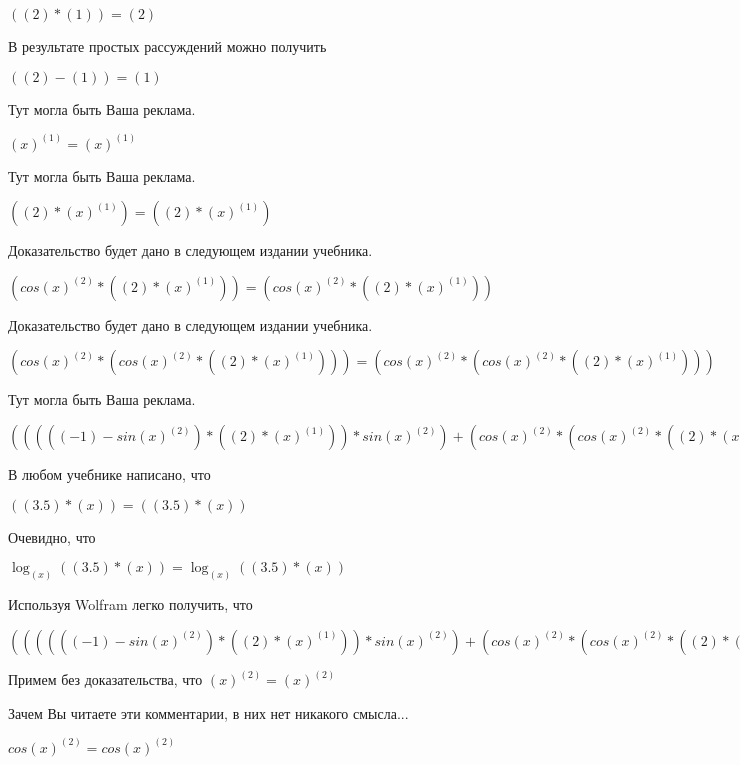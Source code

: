 \documentclass[12pt,a4paper,fleqn]{article}
\theoremstyle{definition}
\begin{document}
$(( 2 ) * ( 1 )) = ( 2 )$

В результате простых рассуждений можно получить

$(( 2 ) - ( 1 )) = ( 1 )$

Тут могла быть Ваша реклама.

${( x )}^{( 1 )} = {( x )}^{( 1 )}$

Тут могла быть Ваша реклама.

$(( 2 ) * {( x )}^{( 1 )}) = (( 2 ) * {( x )}^{( 1 )})$

Доказательство будет дано в следующем издании учебника.

$(cos{( x )}^{( 2 )} * (( 2 ) * {( x )}^{( 1 )})) = (cos{( x )}^{( 2 )} * (( 2 ) * {( x )}^{( 1 )}))$

Доказательство будет дано в следующем издании учебника.

$(cos{( x )}^{( 2 )} * (cos{( x )}^{( 2 )} * (( 2 ) * {( x )}^{( 1 )}))) = (cos{( x )}^{( 2 )} * (cos{( x )}^{( 2 )} * (( 2 ) * {( x )}^{( 1 )})))$

Тут могла быть Ваша реклама.

$((((( -1 ) - sin{( x )}^{( 2 )}) * (( 2 ) * {( x )}^{( 1 )})) * sin{( x )}^{( 2 )}) + (cos{( x )}^{( 2 )} * (cos{( x )}^{( 2 )} * (( 2 ) * {( x )}^{( 1 )})))) = ((((( -1 ) - sin{( x )}^{( 2 )}) * (( 2 ) * {( x )}^{( 1 )})) * sin{( x )}^{( 2 )}) + (cos{( x )}^{( 2 )} * (cos{( x )}^{( 2 )} * (( 2 ) * {( x )}^{( 1 )}))))$

В любом учебнике написано, что

$(( 3.5 ) * ( x )) = (( 3.5 ) * ( x ))$

Очевидно, что

$\log_{( x )}{(( 3.5 ) * ( x ))} = \log_{( x )}{(( 3.5 ) * ( x ))}$

Используя Wolfram легко получить, что

$(((((( -1 ) - sin{( x )}^{( 2 )}) * (( 2 ) * {( x )}^{( 1 )})) * sin{( x )}^{( 2 )}) + (cos{( x )}^{( 2 )} * (cos{( x )}^{( 2 )} * (( 2 ) * {( x )}^{( 1 )})))) * \log_{( x )}{(( 3.5 ) * ( x ))}) = (((((( -1 ) - sin{( x )}^{( 2 )}) * (( 2 ) * {( x )}^{( 1 )})) * sin{( x )}^{( 2 )}) + (cos{( x )}^{( 2 )} * (cos{( x )}^{( 2 )} * (( 2 ) * {( x )}^{( 1 )})))) * \log_{( x )}{(( 3.5 ) * ( x ))})$

Примем без доказательства, что
${( x )}^{( 2 )} = {( x )}^{( 2 )}$

Зачем Вы читаете эти комментарии, в них нет никакого смысла...

$cos{( x )}^{( 2 )} = cos{( x )}^{( 2 )}$
\end{document}
